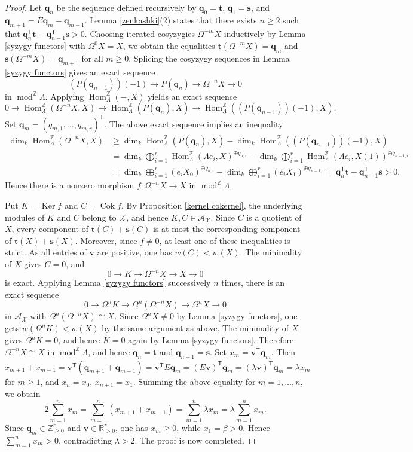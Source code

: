 \documentclass{amsart}
\theoremstyle{definition}
\theoremstyle{remark}
\numberwithin{equation}{thm}
\def\A{\mathcal{A}}
\def\cok{\operatorname{Cok}}
\def\dim{\operatorname{dim}}
\def\gHom{\operatorname{Hom}^{\mathbb{Z}}}
\def\gmod{\operatorname{mod}^{\mathbb{Z}}\!}
\def\ker{\operatorname{Ker}}
\def\L{\Lambda}
\def\ge{\geqslant}
\def\T{\mathsf{T}}
\def\X{\mathcal{X}}
\def\bfs{\mathbf{s}}
\def\bft{\mathbf{t}}
\def\bfq{\mathbf{q}}
\def\bfv{\mathbf{v}}
\begin{document}
\begin{proof}
Let $\bfq_n$ be the sequence defined recursively by $\bfq_0=\bft$, $\bfq_1=\bfs$, and $\bfq_{m+1}=E\bfq_m-\bfq_{m-1}$. Lemma \ref{zenkashki}(2) states that there exists $n\ge 2$ such that $\bfq_n^{\T}\bft-\bfq_{n-1}^{\T}\bfs>0$.
Choosing iterated cosyzygies $\Omega^{-m}X$ inductively by Lemma \ref{syzygy functors} with $\Omega^0X=X$, we obtain the equalities $\bft(\Omega^{-m}X)=\bfq_m$ and $\bfs(\Omega^{-m}X)=\bfq_{m+1}$ for all $m\ge 0$.
Splicing the cosyzygy sequences in Lemma \ref{syzygy functors} gives an exact sequence
$$
(P(\bfq_{n-1}))(-1)\to P(\bfq_n)\to \Omega^{-n}X\to0
$$
in $\gmod\L$. Applying $\gHom_\L(-,X)$ yields an exact sequence
$$
0\to \gHom_\L(\Omega^{-n}X,X)\to \gHom_\L(P(\bfq_n),X)\to \gHom_\L((P(\bfq_{n-1}))(-1),X).
$$
Set $\bfq_m=(q_{m,1},\ldots,q_{m,r})^{\T}$. The above exact sequence implies an inequality
\begin{align*}
\dim_k\gHom_\L(\Omega^{-n}X,X)&\ge\dim_k\gHom_\L(P(\bfq_n),X)- \dim_k\gHom_\L((P(\bfq_{n-1}))(-1),X) \\
&=\dim_k \bigoplus_{i=1}^r\gHom_\L(\L e_i,X)^{\oplus q_{n,i}}- \dim_k\bigoplus_{i=1}^r\gHom_\L(\L e_i,X(1))^{\oplus q_{n-1,i}}\\
&=\dim_k \bigoplus_{i=1}^r (e_iX_0)^{\oplus q_{n,i}}- \dim_k\bigoplus_{i=1}^r (e_iX_1)^{\oplus q_{n-1,i}}=\bfq_n^{\T}\bft-\bfq_{n-1}^{\T}\bfs>0.
\end{align*}
Hence there is a nonzero morphism $f:\Omega^{-n}X\to X$ in $\gmod\L$.

Put $K=\ker f$ and $C=\cok f$. By Proposition \ref{kernel cokernel}, the underlying modules of $K$ and $C$ belong to $\X$, and hence $K,C\in\A_\X$. 
Since $C$ is a quotient of $X$, every component of $\bft(C)+\bfs(C)$ is at most the corresponding component of $\bft(X)+\bfs(X)$. Moreover, since $f\ne0$, at least one of these inequalities is strict.
As all entries of $\bfv$ are positive, one has $w(C)<w(X)$. The minimality of $X$ gives $C=0$, and
$$
0\to K\to \Omega^{-n}X\to X\to0
$$
is exact. Applying Lemma \ref{syzygy functors} successively $n$ times, there is an exact sequence
$$
0\to \Omega^nK\to\Omega^n(\Omega^{-n}X)\to \Omega^nX\to0
$$
in $\A_\X$ with $\Omega^n(\Omega^{-n}X)\cong X$.
Since $\Omega^nX\ne0$ by Lemma \ref{syzygy functors}, one gets $w(\Omega^nK)<w(X)$ by the same argument as above. The minimality of $X$ gives $\Omega^nK=0$, and hence $K=0$ again by Lemma \ref{syzygy functors}. Therefore $\Omega^{-n}X\cong X$ in $\gmod\L$, and hence $\bfq_n=\bft$ and $\bfq_{n+1}=\bfs$.
Set $x_m=\bfv^{\T}\bfq_m$. Then
$$
x_{m+1}+x_{m-1}=\bfv^{\T}(\bfq_{m+1}+\bfq_{m-1})=\bfv^{\T} E\bfq_m=(E\bfv)^{\T} \bfq_m=(\lambda\bfv)^{\T} \bfq_m=\lambda x_m
$$
for $m\ge1$, and $x_n=x_0$, $x_{n+1}=x_1$.
Summing the above equality for $m=1,\ldots,n$, we obtain
$$
2\sum_{m=1}^n x_m=\sum_{m=1}^n(x_{m+1}+x_{m-1})=\sum_{m=1}^n\lambda x_m=\lambda\sum_{m=1}^n x_m.
$$
Since $\bfq_m\in\mathbb{Z}_{\ge 0}^r$ and $\bfv\in\mathbb{R}_{>0}^r$, one has $x_m\ge0$, while $x_1=\beta>0$. Hence $\sum_{m=1}^n x_m>0$, contradicting $\lambda>2$. The proof is now completed.
\end{proof}
\end{document}
